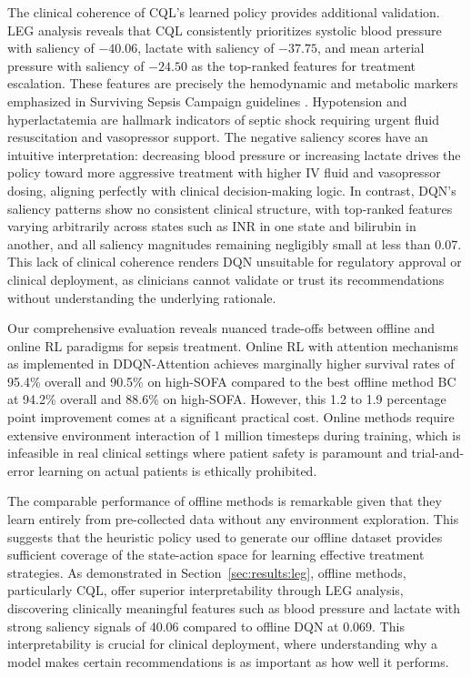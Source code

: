 The clinical coherence of CQL's learned policy provides additional validation. LEG analysis reveals that CQL consistently prioritizes systolic blood pressure with saliency of $-40.06$, lactate with saliency of $-37.75$, and mean arterial pressure with saliency of $-24.50$ as the top-ranked features for treatment escalation. These features are precisely the hemodynamic and metabolic markers emphasized in Surviving Sepsis Campaign guidelines \citep{rhodes2017ssc}. Hypotension and hyperlactatemia are hallmark indicators of septic shock requiring urgent fluid resuscitation and vasopressor support. The negative saliency scores have an intuitive interpretation: decreasing blood pressure or increasing lactate drives the policy toward more aggressive treatment with higher IV fluid and vasopressor dosing, aligning perfectly with clinical decision-making logic. In contrast, DQN's saliency patterns show no consistent clinical structure, with top-ranked features varying arbitrarily across states such as INR in one state and bilirubin in another, and all saliency magnitudes remaining negligibly small at less than 0.07. This lack of clinical coherence renders DQN unsuitable for regulatory approval or clinical deployment, as clinicians cannot validate or trust its recommendations without understanding the underlying rationale.

Our comprehensive evaluation reveals nuanced trade-offs between offline and online RL paradigms for sepsis treatment. Online RL with attention mechanisms as implemented in DDQN-Attention achieves marginally higher survival rates of 95.4\% overall and 90.5\% on high-SOFA compared to the best offline method BC at 94.2\% overall and 88.6\% on high-SOFA. However, this 1.2 to 1.9 percentage point improvement comes at a significant practical cost. Online methods require extensive environment interaction of 1 million timesteps during training, which is infeasible in real clinical settings where patient safety is paramount and trial-and-error learning on actual patients is ethically prohibited.

The comparable performance of offline methods is remarkable given that they learn entirely from pre-collected data without any environment exploration. This suggests that the heuristic policy used to generate our offline dataset provides sufficient coverage of the state-action space for learning effective treatment strategies. As demonstrated in Section~\ref{sec:results:leg}, offline methods, particularly CQL, offer superior interpretability through LEG analysis, discovering clinically meaningful features such as blood pressure and lactate with strong saliency signals of 40.06 compared to offline DQN at 0.069. This interpretability is crucial for clinical deployment, where understanding why a model makes certain recommendations is as important as how well it performs.

